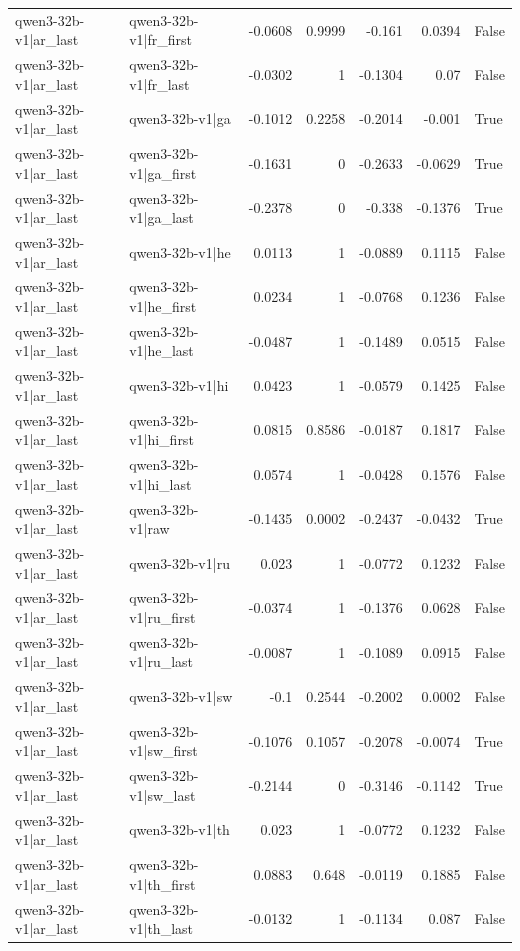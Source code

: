 \begin{table}
\begin{tabular}{l l r r r r l}
qwen3-32b-v1|ar_last & qwen3-32b-v1|fr_first & -0.0608 & 0.9999 & -0.161 & 0.0394 & False \\
qwen3-32b-v1|ar_last & qwen3-32b-v1|fr_last & -0.0302 & 1 & -0.1304 & 0.07 & False \\
qwen3-32b-v1|ar_last & qwen3-32b-v1|ga & -0.1012 & 0.2258 & -0.2014 & -0.001 & True \\
qwen3-32b-v1|ar_last & qwen3-32b-v1|ga_first & -0.1631 & 0 & -0.2633 & -0.0629 & True \\
qwen3-32b-v1|ar_last & qwen3-32b-v1|ga_last & -0.2378 & 0 & -0.338 & -0.1376 & True \\
qwen3-32b-v1|ar_last & qwen3-32b-v1|he & 0.0113 & 1 & -0.0889 & 0.1115 & False \\
qwen3-32b-v1|ar_last & qwen3-32b-v1|he_first & 0.0234 & 1 & -0.0768 & 0.1236 & False \\
qwen3-32b-v1|ar_last & qwen3-32b-v1|he_last & -0.0487 & 1 & -0.1489 & 0.0515 & False \\
qwen3-32b-v1|ar_last & qwen3-32b-v1|hi & 0.0423 & 1 & -0.0579 & 0.1425 & False \\
qwen3-32b-v1|ar_last & qwen3-32b-v1|hi_first & 0.0815 & 0.8586 & -0.0187 & 0.1817 & False \\
qwen3-32b-v1|ar_last & qwen3-32b-v1|hi_last & 0.0574 & 1 & -0.0428 & 0.1576 & False \\
qwen3-32b-v1|ar_last & qwen3-32b-v1|raw & -0.1435 & 0.0002 & -0.2437 & -0.0432 & True \\
qwen3-32b-v1|ar_last & qwen3-32b-v1|ru & 0.023 & 1 & -0.0772 & 0.1232 & False \\
qwen3-32b-v1|ar_last & qwen3-32b-v1|ru_first & -0.0374 & 1 & -0.1376 & 0.0628 & False \\
qwen3-32b-v1|ar_last & qwen3-32b-v1|ru_last & -0.0087 & 1 & -0.1089 & 0.0915 & False \\
qwen3-32b-v1|ar_last & qwen3-32b-v1|sw & -0.1 & 0.2544 & -0.2002 & 0.0002 & False \\
qwen3-32b-v1|ar_last & qwen3-32b-v1|sw_first & -0.1076 & 0.1057 & -0.2078 & -0.0074 & True \\
qwen3-32b-v1|ar_last & qwen3-32b-v1|sw_last & -0.2144 & 0 & -0.3146 & -0.1142 & True \\
qwen3-32b-v1|ar_last & qwen3-32b-v1|th & 0.023 & 1 & -0.0772 & 0.1232 & False \\
qwen3-32b-v1|ar_last & qwen3-32b-v1|th_first & 0.0883 & 0.648 & -0.0119 & 0.1885 & False \\
qwen3-32b-v1|ar_last & qwen3-32b-v1|th_last & -0.0132 & 1 & -0.1134 & 0.087 & False \\

\end{tabular}
\end{table}

